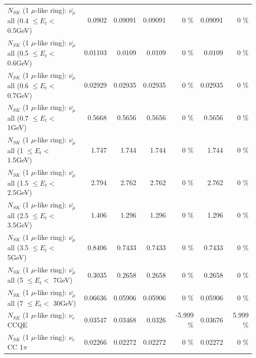 \begin{table}
\begin{tabular}{| l | r | r | r  r | r  r |}
 $N_{SK}$ (1 $\mu$-like ring): $\bar{\nu_{\mu}}$ all (0.4 $\leq E_{t} <$ 0.5GeV) &          0.0902 &         0.09091 &         0.09091 &        0 \%  &         0.09091 &        0 \%  \\ 
 $N_{SK}$ (1 $\mu$-like ring): $\bar{\nu_{\mu}}$ all (0.5 $\leq E_{t} <$ 0.6GeV) &         0.01103 &          0.0109 &          0.0109 &        0 \%  &          0.0109 &        0 \%  \\ 
 $N_{SK}$ (1 $\mu$-like ring): $\bar{\nu_{\mu}}$ all (0.6 $\leq E_{t} <$ 0.7GeV) &         0.02929 &         0.02935 &         0.02935 &        0 \%  &         0.02935 &        0 \%  \\ 
   $N_{SK}$ (1 $\mu$-like ring): $\bar{\nu_{\mu}}$ all (0.7 $\leq E_{t} <$ 1GeV) &          0.5668 &          0.5656 &          0.5656 &        0 \%  &          0.5656 &        0 \%  \\ 
   $N_{SK}$ (1 $\mu$-like ring): $\bar{\nu_{\mu}}$ all (1 $\leq E_{t} <$ 1.5GeV) &           1.747 &           1.744 &           1.744 &        0 \%  &           1.744 &        0 \%  \\ 
 $N_{SK}$ (1 $\mu$-like ring): $\bar{\nu_{\mu}}$ all (1.5 $\leq E_{t} <$ 2.5GeV) &           2.794 &           2.762 &           2.762 &        0 \%  &           2.762 &        0 \%  \\ 
 $N_{SK}$ (1 $\mu$-like ring): $\bar{\nu_{\mu}}$ all (2.5 $\leq E_{t} <$ 3.5GeV) &           1.406 &           1.296 &           1.296 &        0 \%  &           1.296 &        0 \%  \\ 
   $N_{SK}$ (1 $\mu$-like ring): $\bar{\nu_{\mu}}$ all (3.5 $\leq E_{t} <$ 5GeV) &          0.8406 &          0.7433 &          0.7433 &        0 \%  &          0.7433 &        0 \%  \\ 
     $N_{SK}$ (1 $\mu$-like ring): $\bar{\nu_{\mu}}$ all (5 $\leq E_{t} <$ 7GeV) &          0.3035 &          0.2658 &          0.2658 &        0 \%  &          0.2658 &        0 \%  \\ 
    $N_{SK}$ (1 $\mu$-like ring): $\bar{\nu_{\mu}}$ all (7 $\leq E_{t} <$ 30GeV) &         0.06636 &         0.05906 &         0.05906 &        0 \%  &         0.05906 &        0 \%  \\ 
\hline
\hline
\hline
                                      $N_{SK}$ (1 $\mu$-like ring): $\nu_e$ CCQE &         0.03547 &         0.03468 &          0.0326 &   -5.999 \%  &         0.03676 &    5.999 \%  \\ 
                                 $N_{SK}$ (1 $\mu$-like ring): $\nu_e$ CC 1$\pi$ &         0.02266 &         0.02272 &         0.02272 &        0 \%  &         0.02272 &        0 \%  \\ 

\end{tabular}
\end{table}
